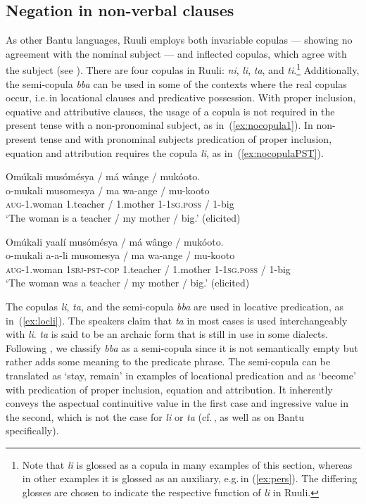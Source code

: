 \documentclass[output=paper,colorlinks,citecolor=brown,draftmode]{langscibook}
\begin{document}
\subsection{Negation in non-verbal clauses}\label{sec:non-verbalruuli}\label{sec:ruulietal:2.3}

As other Bantu languages, Ruuli employs both invariable copulas — showing no agreement with the nominal subject — and inflected copulas, which agree with the subject (see \citealt{GibsonEtAl2019}). 
There are four copulas in Ruuli: \textit{ni}, \textit{li}, \textit{ta}, %
and \textit{ti}.\footnote{Note that \textit{li} is glossed as a copula in many examples of this section, whereas in other examples it is glossed as an auxiliary, e.g.\,in (\ref{ex:pers}). 
The differing glosses are chosen to indicate the respective function of \textit{li} in Ruuli.}
Additionally, the semi-copula \textit{bba} can be used in some of the contexts where the real copulas occur, i.e.\,in locational clauses and predicative possession.
With proper inclusion, equative and attributive clauses, the usage of a copula is not required in the present tense with a non-pronominal subject, as in~(\ref{ex:nocopula1}).
In non-present tense and with pronominal subjects predication of proper inclusion, equation and attribution requires the copula \textit{li}, as in~(\ref{ex:nocopulaPST}). 

\ea \label{ex:nonverbal}
\begin{xlist}
	\ex \label{ex:nocopula1}
	\glll Omúkali musómésya / má wânge / mukóoto.\\
	    o-mukali musomesya / ma wa-ange / mu-kooto\\
		\textsc{aug}-1.woman 1.teacher / 1.mother 1-1\textsc{sg.poss} / 1-big\\
\glt ‘The woman is a teacher / my mother / big.’ (elicited)

\ex  \label{ex:nocopulaPST}
\glll Omúkali yaalí musómésya / má wânge / mukóoto.\\
	    o-mukali a-a-li musomesya / ma wa-ange / mu-kooto\\
		\textsc{aug}-1.woman \textsc{1sbj}-\textsc{pst}-\textsc{cop} 1.teacher / 1.mother 1-1\textsc{sg.poss} / 1-big\\
	\glt ‘The woman was a teacher / my mother / big.’ (elicited)
\end{xlist}
\z

The copulas \textit{li}, \textit{ta}, and the semi-copula \textit{bba} are used in locative predication, as in~(\ref{ex:locli}). 
The speakers claim that \textit{ta} in most cases is used interchangeably with \textit{li}. 
\textit{ta} is said to be an archaic form that is still in use in some dialects. 
Following \citet[6]{Pustet2003}, we classify \textit{bba} as a semi-copula since it is not semantically empty but rather adds some meaning to the predicate phrase. 
The semi-copula can be translated as `stay, remain' in examples of locational predication and as `become' with predication of proper inclusion, equation and attribution. 
It inherently conveys the aspectual continuitive value in the first case and ingressive value in the second, which is not the case for \textit{li} or \textit{ta} (cf.\,\citealt[35–36]{Hengeveld1992}, as well as \citealt[214]{GibsonEtAl2019} on Bantu specifically). 
\end{document}
